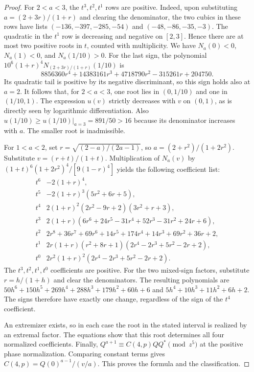\documentclass[11pt]{article}
\begin{document}
\begin{proof}
For \(2<a<3\), the \(t^3,t^2,t^1\) rows are positive.
Indeed, upon substituting \(a=(2+3r)/(1+r)\) and clearing the
denominator, the two cubics in these rows have lists
\((-136,-397,-285,-54)\) and \((-48,-86,-35,-3)\). The quadratic in
the \(t^1\) row is decreasing and negative on \([2,3]\).
Hence there are at most two positive roots in \(t\), counted with
multiplicity. We have \(N_a(0)<0\), \(N_a(1)<0\), and \(N_a(1/10)>0\).
For the last sign, the polynomial
\(10^6(1+r)^4N_{(2+3r)/(1+r)}(1/10)\) is
\[
 8856360r^4+14383161r^3+4718790r^2-315261r+204750 .
\]
Its quadratic tail is positive by its negative discriminant,
so this sign holds also at \(a=2\). It follows that, for \(2<a<3\),
one root lies in \((0,1/10)\) and one in \((1/10,1)\).
The expression \(u(v)\) strictly decreases with \(v\) on \((0,1)\),
as is directly seen by logarithmic differentiation.
Also \(u(1/10)\ge u(1/10)|_{a=3}=891/50>16\) because its
denominator increases with \(a\). The smaller root is inadmissible.

For \(1<a<2\), set \(r=\sqrt{(2-a)/(2a-1)}\), so
\(a=(2+r^2)/(1+2r^2)\). Substitute \(v=(r+t)/(1+t)\).
Multiplication of \(N_a(v)\) by
\((1+t)^6(1+2r^2)^4/[9(1-r)^4]\) yields the following
coefficient list:
\[
\begin{array}{ll}
t^6&-2(1+r)^4,\\
t^5&-2(1+r)^3(5r^2+6r+5),\\
t^4&2(1+r)^2(2r^2-9r+2)(3r^2+r+3),\\
t^3&2(1+r)(6r^6+24r^5-31r^4+52r^3-31r^2+24r+6),\\
t^2&2r^8+36r^7+69r^6+14r^5+174r^4+14r^3+69r^2+36r+2,\\
t^1&2r(1+r)(r^2+8r+1)(2r^4-2r^3+5r^2-2r+2),\\
t^0&2r^2(1+r)^2(2r^4-2r^3+5r^2-2r+2).
\end{array}
\]
The \(t^3,t^2,t^1,t^0\) coefficients are positive. For the two
mixed-sign factors, substitute \(r=h/(1+h)\) and clear the
denominators. The resulting polynomials are
\(50h^6+150h^5+269h^4+288h^3+179h^2+60h+6\) and
\(5h^4+10h^3+11h^2+6h+2\).
The signs therefore have exactly one change, regardless of
the sign of the \(t^4\) coefficient.

An extremizer exists, so in each case the root in the stated
interval is realized by an extremal factor. The equations show
that this root determines all four normalized coefficients.
Finally, \(Q^{a+1}\equiv C(4,p)QQ^*\pmod{z^5}\) at the positive
phase normalization. Comparing constant terms gives
\(C(4,p)=Q(0)^{a-1}/(v/a)\). This proves the formula and the
classification.
\end{proof}
\end{document}
